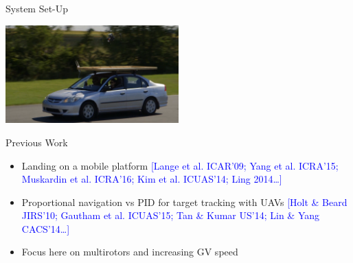 \begin{frame}{System Set-Up}
\begin{minipage}[t]{0.45\linewidth}
        \end{minipage}
     \begin{center}
     \includegraphics[width=0.5\textwidth]{figures/landing.png}
     \end{center}
\end{frame}

\begin{frame}{Previous Work}

\begin{itemize}
\item Landing on a mobile platform 
\textcolor{blue}{[Lange et al. ICAR'09; Yang et al. ICRA'15; Muskardin et al. ICRA'16; Kim et al. ICUAS'14; Ling 2014\ldots]}
\vspace{0.5cm}
\item Proportional navigation vs PID for target tracking with UAVs
\textcolor{blue}{[Holt \& Beard JIRS'10; Gautham et al. ICUAS'15; Tan \& Kumar US'14; Lin \& Yang CACS'14\ldots]}
\vspace{0.5cm}
\item Focus here on multirotors and increasing GV speed
\end{itemize}

\end{frame}
